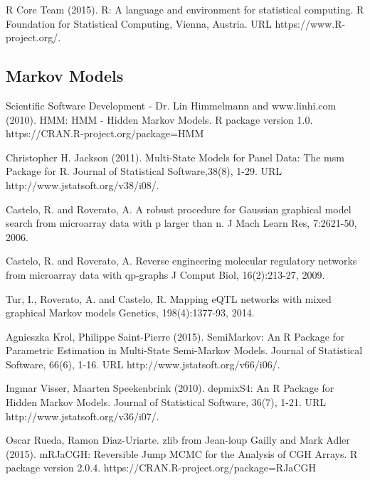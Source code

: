 
\begin{thebibliography}{00}

R Core Team (2015). 
\newblock R: A language and environment for statistical computing. R Foundation for Statistical Computing, Vienna, Austria.
\newblock URL https://www.R-project.org/.

\subsection{Markov Models}

 Scientific Software Development - Dr. Lin Himmelmann and www.linhi.com (2010). 
\newblock HMM: HMM - Hidden Markov Models. 
\newblock R package version 1.0. https://CRAN.R-project.org/package=HMM

 Christopher H. Jackson (2011). 
\newblock Multi-State Models for Panel Data: The msm Package for R. 
\newblock Journal of Statistical Software,38(8), 1-29. URL http://www.jstatsoft.org/v38/i08/.

 Castelo, R. and Roverato, A. 
\newblock A robust procedure for Gaussian graphical model search from microarray data with p larger than n. 
\newblock J Mach Learn Res, 7:2621-50, 2006.

 Castelo, R. and Roverato, A. 
\newblock Reverse engineering molecular regulatory networks from microarray data with qp-graphs 
\newblock J Comput Biol, 16(2):213-27, 2009.

 Tur, I., Roverato, A. and Castelo, R. 
\newblock Mapping eQTL networks with mixed graphical Markov models 
\newblock Genetics, 198(4):1377-93, 2014.

 Agnieszka Krol, Philippe Saint-Pierre (2015). 
\newblock SemiMarkov: An R Package for Parametric Estimation in Multi-State Semi-Markov Models. 
\newblock Journal of Statistical Software, 66(6), 1-16. URL http://www.jstatsoft.org/v66/i06/.

 Ingmar Visser, Maarten Speekenbrink (2010). 
\newblock depmixS4: An R Package for Hidden Markov Models. 
\newblock Journal of Statistical Software, 36(7), 1-21. URL http://www.jstatsoft.org/v36/i07/.

 Oscar Rueda, Ramon Diaz-Uriarte. zlib from Jean-loup Gailly and Mark Adler (2015). 
\newblock mRJaCGH: Reversible Jump MCMC for the Analysis of CGH Arrays. 
\newblock R package version 2.0.4. https://CRAN.R-project.org/package=RJaCGH

\end{thebibliography}


